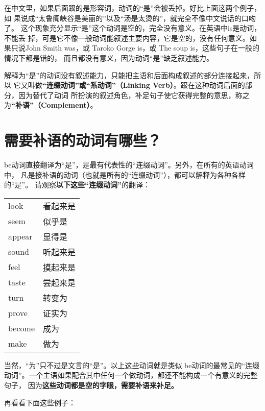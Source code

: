 \documentclass{yufa}
\begin{document}
在中文里，如果后面跟的是形容词，动词的“是”会被丢掉。好比上面这两个例子，如
果说成“太鲁阁峡谷是美丽的”以及“汤是太烫的”，就完全不像中文说话的口吻了。
这个现象充分显示“是”这个动词是空的，完全没有意义。在英语中is是动词，不能丢
掉，可是它不像一般动词能叙述主要内容，它是空的，没有任何意义。如果只说John
Smith was，或 Taroko Gorge is，或 The soup is，这些句子在一般的情况下都是错的，
而且都没有意义，因为动词“是”缺乏叙述能力。

解释为“是”的动词没有叙述能力，只能把主语和后面构成叙述的部分连接起来，所以
它又叫做\textbf{“连缀动词”或“系动词”（Linking Verb）}。跟在这种动词后面的部分，因为替代了动词
所扮演的叙述角色，补足句子使它获得完整的意思，称之为\textbf{“补语”（Complement）}。

\section{需要补语的动词有哪些？}

be动词直接翻译为“是”，是最有代表性的“连缀动词”。另外，在所有的英语动词中，
凡是接补语的动词（也就是所有的“连缀动词”），都可以解释为各种各样的“是”。
请观察\textbf{以下这些“连缀动词”}的翻译：

\begin{longtable}[]{@{}ll@{}}
  look & 看起来是 \\
  seem & 似乎是 \\
  appear & 显得是 \\
  sound & 听起来是 \\
  feel & 摸起来是 \\
  taste & 尝起来是 \\
  turn & 转变为 \\
  prove & 证实为 \\
  become & 成为 \\
  make & 做为 \\
\end{longtable}

当然，“为”只不过是文言的“是”。以上这些动词就是类似 be动词的最常见的“连缀
动词”。一个主语如果配合其中任何一个做动词，都还不能构成一个有意义的完整句子，
因为\textbf{这些动词都是空的字眼，需要补语来补足。}

再看看下面这些例子：
\end{document}
